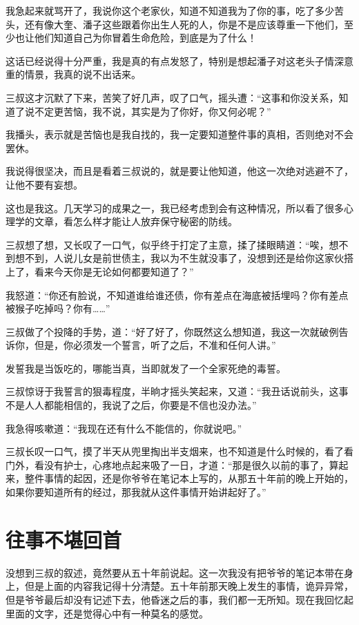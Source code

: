 我急起来就骂开了，我说你这个老家伙，知道不知道我为了你的事，吃了多少苦头，还有像大奎、潘子这些跟着你出生人死的人，你是不是应该尊重一下他们，至少也让他们知道自己为你冒着生命危险，到底是为了什么！

这话已经说得十分严重，我是真的有点发怒了，特别是想起潘子对这老头子情深意重的情景，我真的说不出话来。

三叔这才沉默了下来，苦笑了好几声，叹了口气，摇头遭：“这事和你没关系，知道了说不定更苦恼，我不说，其实是为了你好，你又何必呢？”

我播头，表示就是苦恼也是我自找的，我一定要知道整件事的真相，否则绝对不会罢休。

我说得很坚决，而且是看着三叔说的，就是要让他知道，他这一次绝对逃避不了，让他不要有妄想。

这也是我这。几天学习的成果之一，我已经考虑到会有这种情况，所以看了很多心理学的文章，看怎么样才能让人放弃保守秘密的防线。

三叔想了想，又长叹了一口气，似乎终于打定了主意，揉了揉眼睛道：“唉，想不到想不到，人说儿女是前世债主，我以为不生就没事了，没想到还是给你这家伙搭上了，看来今天你是无论如何都要知道了？”

我怒道：“你还有脸说，不知道谁给谁还债，你有差点在海底被括埋吗？你有差点被猴子吃掉吗？你有……”

三叔做了个投降的手势，道：“好了好了，你既然这么想知道，我这一次就破例告诉你，但是，你必须发一个誓言，听了之后，不准和任何人讲。”

发誓我是当饭吃的，哪能当真，当即就发了一个全家死绝的毒誓。

三叔惊讶于我誓言的狠毒程度，半晌才摇头笑起来，又道：“我丑话说前头，这事不是人人都能相信的，我说了之后，你要是不信也没办法。”

我急得咳嗽道：“我现在还有什么不能信的，你就说吧。”

三叔长叹一口气，摸了半天从兜里掏出半支烟来，也不知道是什么时候的，看了看门外，看没有护士，心疼地点起来吸了一日，才道：“那是很久以前的事了，算起来，整件事情的起因，还是你爷爷在笔记本上写的，从那五十年前的晚上开始的，如果你要知道所有的经过，那我就从这件事情开始讲起好了。”

\chapter{往事不堪回首}

没想到三叔的叙述，竟然要从五十年前说起。这一次我没有把爷爷的笔记本带在身上，但是上面的内容我记得十分清楚。五十年前那天晚上发生的事情，诡异异常，但是爷爷最后却没有记述下去，他昏迷之后的事，我们都一无所知。现在我回忆起里面的文字，还是觉得心中有一种莫名的感觉。

